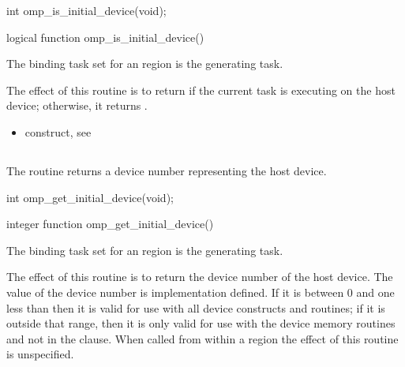 \begin{samepage}
\format
\ccppspecificstart
\begin{boxedcode}
int omp\_is\_initial\_device(void);
\end{boxedcode}
\ccppspecificend
\end{samepage}

\fortranspecificstart
\begin{boxedcode}
logical function omp\_is\_initial\_device()
\end{boxedcode}
\fortranspecificend

\binding
The binding task set for an  region is the generating task.

\effect
The effect of this routine is to return  if the current task is executing on the host 
device; otherwise, it returns .

\crossreferences
\begin{itemize}
\item {} construct, see 
\end{itemize}





\subsection{}
\label{subsec:omp_get_initial_device}
\summary
The  routine returns a device number representing
the host device.

\pagebreak

\begin{samepage}
\format
\ccppspecificstart
\begin{boxedcode}
int omp\_get\_initial\_device(void);
\end{boxedcode}
\ccppspecificend
\end{samepage}

\fortranspecificstart
\begin{boxedcode}
integer function omp\_get\_initial\_device()
\end{boxedcode}
\fortranspecificend

\binding
The binding task set for an  region is the generating task.

\effect
The effect of this routine is to return the device number of the host device.
The value of the device number is implementation defined. If it is between 0 
and one less than  then it is valid for use 
with all device constructs and routines; if it is outside that range, then 
it is only valid for use with the device memory routines and not in the 
 clause. When called from within a  region 
the effect of this routine is unspecified.


